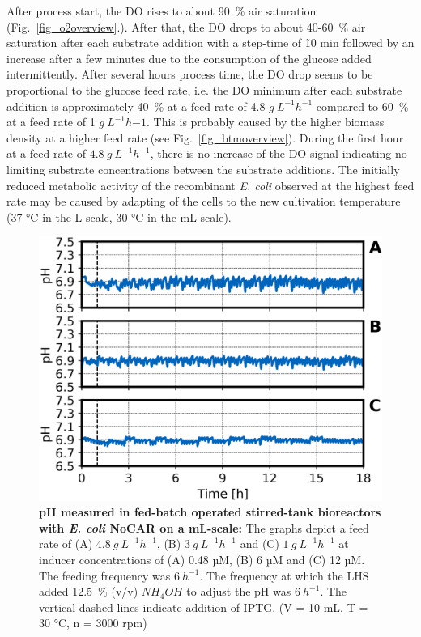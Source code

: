 \documentclass[sn-standardnature]{sn-jnl}%
\theoremstyle{thmstyleone}%
\theoremstyle{thmstyletwo}%
\theoremstyle{thmstylethree}%
\begin{document}
After process start, the DO rises to about 90~\% air saturation (Fig.~\ref{fig_o2overview}.).
After that, the DO drops to about 40-60~\% air saturation after each substrate addition with a step-time of \~10 min followed by an increase after a few minutes due to the consumption of the glucose added intermittently.
After several hours process time, the DO drop seems to be proportional to the glucose feed rate, i.e. the DO minimum after each substrate addition is approximately 40~\% at a feed rate of 4.8 $ g\ L^{-1} h^{-1}$ compared to 60~\% at a feed rate of 1 $ g\ L^{-1} h{-1}$.
This is probably caused by the higher biomass density at a higher feed rate (see Fig.~\ref{fig_btmoverview}).
During the first hour at a feed rate of $4.8\ g\ L^{-1} h^{-1}$, there is no increase of the DO signal indicating no limiting substrate concentrations between the substrate additions.
The initially reduced metabolic activity of the recombinant \textit{E. coli} observed at the highest feed rate may be caused by adapting of the cells to the new cultivation temperature (37 °C in the L-scale, 30 °C in the mL-scale).

\begin{figure}[h]
    \centering
    \includegraphics[width=1.0\textwidth]{figures/pH_overview.png}
    \caption{
        \textbf{pH measured in fed-batch operated stirred-tank bioreactors with \textit{E. coli} NoCAR on a mL-scale:}
        The graphs depict a feed rate of (A) $4.8\ g\ L^{-1} h^{-1}$, (B) $3\ g\ L^{-1} h^{-1}$ and (C) $1\ g\ L^{-1} h^{-1}$ at inducer concentrations of (A) 0.48 µM, (B) 6 µM and (C) 12 µM.
        The feeding frequency was $6\ h^{-1}$.
        The frequency at which the LHS added 12.5~\% (v/v) $NH_{4}OH$ to adjust the pH was $6\ h^{-1}$.
        The vertical dashed lines indicate addition of IPTG.
        (V = 10 mL, T = 30 °C, n = 3000 rpm)
    }
    \label{fig_pHoverview}
\end{figure}
\end{document}
